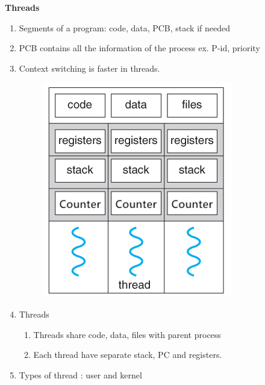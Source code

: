 
\centerline{\textbf{ \LARGE Threads}}




\begin{enumerate}

  \item Segments of a program: code, data, PCB, stack if needed
  \item PCB contains all the information of the process ex. P-id, priority
  \item Context switching is faster in threads.

  \begin{figure}[h]
      \centering   \includegraphics[scale=2]{./images/threads_01.jpeg}
  \end{figure}

  \item Threads
    \begin{enumerate}
      \item Threads share code, data, files with parent process
      \item Each thread have separate stack, PC and registers.
    \end{enumerate}

  \item Types of thread : user and kernel


\end{enumerate}
